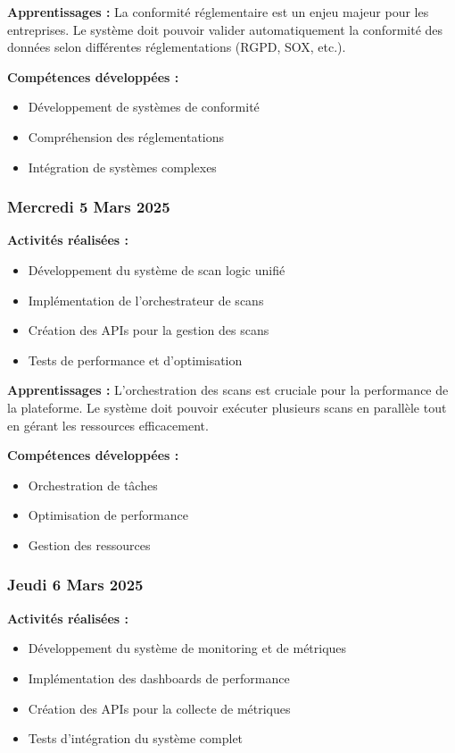 \documentclass[12pt,a4paper]{article}
\begin{document}
\textbf{Apprentissages :}
La conformité réglementaire est un enjeu majeur pour les entreprises. Le système doit pouvoir valider automatiquement la conformité des données selon différentes réglementations (RGPD, SOX, etc.).

\textbf{Compétences développées :}
\begin{itemize}
    \item Développement de systèmes de conformité
    \item Compréhension des réglementations
    \item Intégration de systèmes complexes
\end{itemize}

\subsubsection{Mercredi 5 Mars 2025}
\textbf{Activités réalisées :}
\begin{itemize}
    \item Développement du système de scan logic unifié
    \item Implémentation de l'orchestrateur de scans
    \item Création des APIs pour la gestion des scans
    \item Tests de performance et d'optimisation
\end{itemize}

\textbf{Apprentissages :}
L'orchestration des scans est cruciale pour la performance de la plateforme. Le système doit pouvoir exécuter plusieurs scans en parallèle tout en gérant les ressources efficacement.

\textbf{Compétences développées :}
\begin{itemize}
    \item Orchestration de tâches
    \item Optimisation de performance
    \item Gestion des ressources
\end{itemize}

\subsubsection{Jeudi 6 Mars 2025}
\textbf{Activités réalisées :}
\begin{itemize}
    \item Développement du système de monitoring et de métriques
    \item Implémentation des dashboards de performance
    \item Création des APIs pour la collecte de métriques
    \item Tests d'intégration du système complet
\end{itemize}
\end{document}
